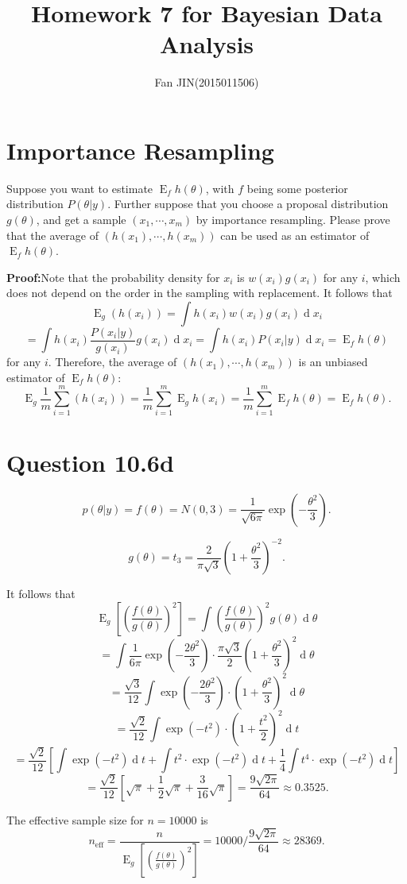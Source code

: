 \documentclass{article}
\DeclareMathOperator*{\expec}{E}
\DeclareMathOperator*{\deriv}{d}
\begin{document}
\title{\textsf{Homework 7 for Bayesian Data Analysis}}
\author{Fan JIN\quad (2015011506)}
\maketitle

\section*{Importance Resampling}
{
    Suppose you want to estimate $\expec_f h(\theta)$, with $f$ being some posterior distribution $P(\theta|y)$. Further suppose that you choose a proposal distribution $g(\theta)$, and get a sample $(x_1, \cdots, x_m)$ by importance resampling. Please prove that the average of $(h(x_1), \cdots, h(x_m))$ can be used as an estimator of $\expec_f h(\theta)$.

    \textbf{Proof:}\quad Note that the probability density for $x_i$ is $w(x_i) g(x_i)$ for any $i$, which does not depend on the order in the sampling with replacement. It follows that 
    $$\expec_g {(h(x_i))} = \int{ h(x_i) w(x_i) g(x_i) \deriv{x_i} }$$
    $$ = \int{ h(x_i) \frac{P(x_i|y)}{g(x_i)} g(x_i) \deriv{x_i} } = \int{ h(x_i) P(x_i|y) \deriv{x_i} } = \expec_f h(\theta)$$ for any $i$. Therefore, the average of $(h(x_1), \cdots, h(x_m))$ is an unbiased estimator of $\expec_f h(\theta)$:
    $$\expec_g {\frac{1}{m} \sum_{i=1}^{m}{(h(x_i))}} = \frac{1}{m} \sum_{i=1}^{m} {\expec_g {h(x_i)}} = \frac{1}{m} \sum_{i=1}^{m} {\expec_f h(\theta)} = \expec_f h(\theta).$$
}

\section*{Question 10.6d}
{
    $$p(\theta|y) = f(\theta) = N(0, 3) = \frac{1}{\sqrt{6\pi}} \exp{\left( -\frac{\theta^2}{3} \right)}.$$

    $$g(\theta) = t_3 = \frac{2}{\pi \sqrt{3}} \left( 1+\frac{\theta^2}{3} \right) ^{-2}.$$

    It follows that 
    $$\expec_g{\left[ (\frac{f(\theta)}{g(\theta)})^2 \right]} = \int {(\frac{f(\theta)}{g(\theta)})^2 g(\theta) \deriv{\theta}}$$
    $$= \int {\frac{1}{6\pi} \exp{\left( -\frac{2\theta^2}{3} \right)} \cdot \frac{\pi \sqrt{3}}{2} \left( 1+\frac{\theta^2}{3} \right)^2 \deriv{\theta}}$$
    $$= \frac{\sqrt{3}}{12} \int { \exp{\left( -\frac{2\theta^2}{3} \right)} \cdot \left( 1+\frac{\theta^2}{3} \right)^2 \deriv{\theta}}$$
    $$= \frac{\sqrt{2}}{12} \int { \exp{\left( -t^2 \right)} \cdot \left( 1+\frac{t^2}{2} \right)^2 \deriv{t}}$$
    $$= \frac{\sqrt{2}}{12} \left[ \int { \exp{\left( -t^2 \right)} \deriv{t}} + \int { t^2 \cdot \exp{\left( -t^2 \right)} \deriv{t}} + \frac{1}{4} \int { t^4 \cdot \exp{\left( -t^2 \right)} \deriv{t}} \right] $$
    $$= \frac{\sqrt{2}}{12} \left[ \sqrt{\pi} + \frac{1}{2}\sqrt{\pi} + \frac{3}{16}\sqrt{\pi} \right] = \frac{9\sqrt{2\pi}}{64} \approx 0.3525.$$

    The effective sample size for $n=10000$ is
    $$n_\mathrm{eff} = \frac{n}{\expec_g{\left[ (\frac{f(\theta)}{g(\theta)})^2 \right]}} = 10000 / \frac{9\sqrt{2\pi}}{64} \approx 28369.$$
}
\end{document}
